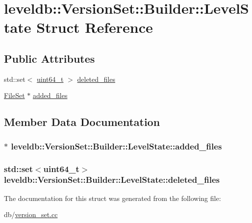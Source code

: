 \hypertarget{structleveldb_1_1_version_set_1_1_builder_1_1_level_state}{\section{leveldb\-:\-:Version\-Set\-:\-:Builder\-:\-:Level\-State Struct Reference}
\label{structleveldb_1_1_version_set_1_1_builder_1_1_level_state}
}
\subsection*{Public Attributes}
\begin{DoxyCompactItemize}
\item 
std\-::set$<$ \hyperlink{stdint_8h_aaa5d1cd013383c889537491c3cfd9aad}{uint64\-\_\-t} $>$ \hyperlink{structleveldb_1_1_version_set_1_1_builder_1_1_level_state_ac92628909cea4ee134314b5884256619}{deleted\-\_\-files}
\item 
\hyperlink{classleveldb_1_1_version_set_1_1_builder_add38ea04d208ebaa9b486597c7b6246a}{File\-Set} $\ast$ \hyperlink{structleveldb_1_1_version_set_1_1_builder_1_1_level_state_aeb9a2d830ae2cc5f65c5395e3ece341d}{added\-\_\-files}
\end{DoxyCompactItemize}


\subsection{Member Data Documentation}
\hypertarget{structleveldb_1_1_version_set_1_1_builder_1_1_level_state_aeb9a2d830ae2cc5f65c5395e3ece341d}{
\subsubsection[{added\-\_\-files}]{$\ast$ leveldb\-::\-Version\-Set\-::\-Builder\-::\-Level\-State\-::added\-\_\-files}}\label{structleveldb_1_1_version_set_1_1_builder_1_1_level_state_aeb9a2d830ae2cc5f65c5395e3ece341d}
\hypertarget{structleveldb_1_1_version_set_1_1_builder_1_1_level_state_ac92628909cea4ee134314b5884256619}{
\subsubsection[{deleted\-\_\-files}]{\setlength{\rightskip}{0pt plus 5cm}std\-::set$<${\bf uint64\-\_\-t}$>$ leveldb\-::\-Version\-Set\-::\-Builder\-::\-Level\-State\-::deleted\-\_\-files}}\label{structleveldb_1_1_version_set_1_1_builder_1_1_level_state_ac92628909cea4ee134314b5884256619}


The documentation for this struct was generated from the following file\-:\begin{DoxyCompactItemize}
\item 
db/\hyperlink{version__set_8cc}{version\-\_\-set.\-cc}\end{DoxyCompactItemize}
